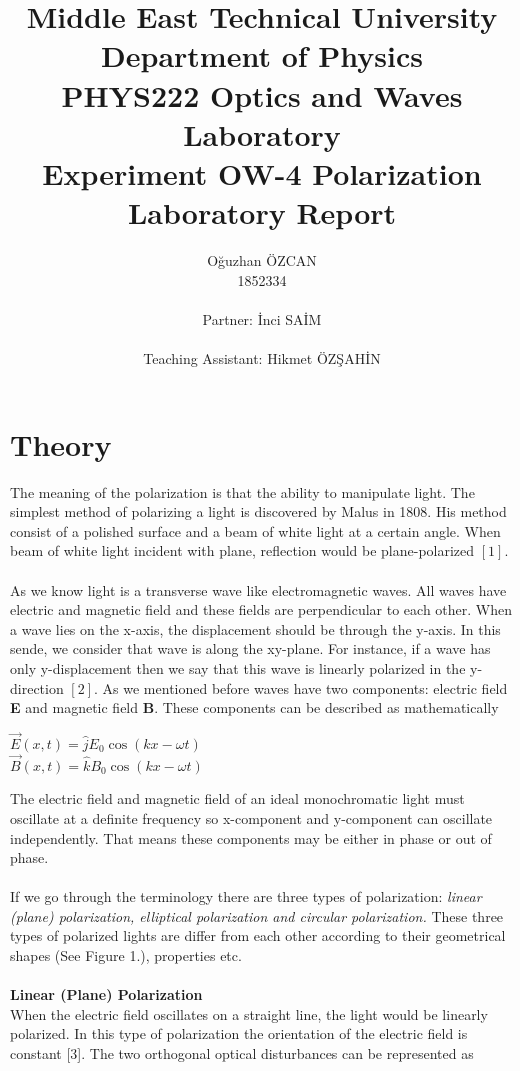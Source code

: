 \documentclass[a4paper,12pt]{report}
\title{Middle East Technical University\\Department of Physics\\PHYS222 Optics and Waves Laboratory\\\textbf{Experiment OW-4 Polarization\\Laboratory Report}}
\author{Oğuzhan ÖZCAN\\1852334\\\\Partner: İnci SAİM\\\\Teaching Assistant: Hikmet ÖZŞAHİN}
\begin{document}
\maketitle
\tableofcontents
\listoffigures

\chapter{Theory}
The meaning of the polarization is that the ability to manipulate light. The simplest method of polarizing a light is discovered by Malus in 1808. His method consist of a polished surface and a beam of white light at a certain angle. When beam of white light incident with plane, reflection would be plane-polarized $[1]$.\\\\
As we know light is a transverse wave like electromagnetic waves. All waves have electric and magnetic field and these fields are perpendicular to each other. When a wave lies on the x-axis, the displacement should be through the y-axis. In this sende, we consider that wave is along the xy-plane. For instance, if a wave has only y-displacement then we say that this wave is linearly polarized in the y-direction $[2]$. As we mentioned before waves have two components: electric field \textbf{E} and magnetic field \textbf{B}. These components can be described as mathematically
\begin{center}
	$\vec{E}(x,t)=\hat{j}E_{0}\cos(kx-\omega t)$\\$\vec{B}(x,t)=\hat{k}B_{0}\cos(kx-\omega t)$
\end{center}
The electric field and magnetic field of an ideal monochromatic light must oscillate at a definite frequency so x-component and y-component can oscillate independently. That means these components may be either in phase or out of phase.\\\\
If we go through the terminology there are three types of polarization: \textit{linear (plane) polarization, elliptical polarization and circular polarization.} These three types of polarized lights are differ from each other  according to their geometrical shapes (See Figure 1.), properties etc.\\\\
\textbf{Linear (Plane) Polarization}\\
When the electric field oscillates on a straight line, the light would be linearly polarized. In this type of polarization the orientation of the electric field is constant [3]. The two orthogonal optical disturbances can be represented as  
\end{document}
